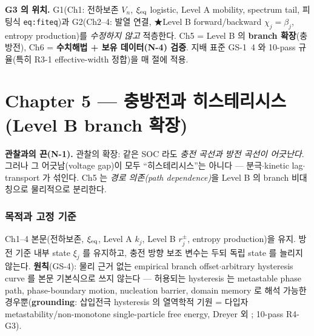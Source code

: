 
\begin{mdframed}
\textbf{G3 의 위치.} G1(Ch1: 전하보존 $V_n$, $\xi_{\mathrm{eq}}$ logistic, Level A mobility, spectrum tail,
피팅식 \texttt{eq:fiteq})과 G2(Ch2--4: 발열 연결, ★Level B forward/backward $\chi_j=\beta_j$,
entropy production)를 \emph{수정하지 않고} 적층한다. Ch5 = Level B 의 \textbf{branch 확장}(충방전),
Ch6 = \textbf{수치해법 + 보유 데이터(N-4) 검증}. 지배 표준 GS-1~4 와 10-pass 규율(특히 R3-1
effective-width 정합)을 매 절에 적용.
\end{mdframed}
\newpage

\part*{Chapter 5 — 충방전과 히스테리시스 (Level B branch 확장)}
\setcounter{section}{0}

\begin{anchorbox}
\textbf{관찰과의 끈(N-1).} 관찰의 확장: 같은 SOC 라도 \emph{충전 곡선과 방전 곡선이 어긋난다}.
그러나 그 어긋남(voltage gap)이 모두 ``히스테리시스''는 아니다 — 분극$\cdot$kinetic lag$\cdot$
transport 가 섞인다. Ch5 는 \emph{경로 의존(path dependence)}을 Level B 의 branch 비대칭으로
물리적으로 분리한다.
\end{anchorbox}

\section{목적과 고정 기준}\label{sec:ch5_scope}
Ch1--4 본문(전하보존, $\xi_{\mathrm{eq}}$, Level A $k_j$, Level B $r_j^\pm$, entropy production)을 유지.
방전 기준 내부 state $\xi_j$ 를 유지하고, 충전 방향 보조 변수는 두되 독립 state 를 늘리지 않는다.
\textbf{원칙}(GS-4): 물리 근거 없는 empirical branch offset$\cdot$arbitrary hysteresis curve 를 본문
기본식으로 쓰지 않는다 — 허용되는 hysteresis 는 metastable phase path, phase-boundary motion,
nucleation barrier, domain memory 로 해석 가능한 경우뿐(\textbf{grounding}: 삽입전극 hysteresis 의
열역학적 기원 = 다입자 metastability/non-monotone single-particle free energy, Dreyer 외
\cite{dreyer2010}; 10-pass R4-G3).

